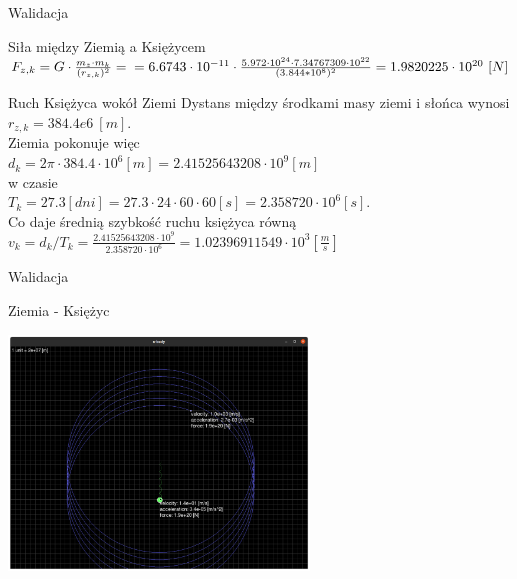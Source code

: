 \documentclass{beamer}
\begin{document}
\begin{frame}{Walidacja}
    \begin{block}{Siła między Ziemią a Księżycem}
        $F_{z,k} = G\cdot \frac{m_{z}\cdot m_{k}}{(r_{z,k})^2} = \\
        = 6.6743\cdot 10^{-11}\cdot 
        \frac{5.972\cdot 10^{24}\cdot 7.34767309\cdot 10^{22}}
        {(3.844 * 10^{8})^2} = 1.9820225\cdot 10^{20}\ [N]$
    \end{block}
    
    \begin{block}{Ruch Księżyca wokół Ziemi}
        Dystans między środkami masy ziemi i słońca wynosi\\ 
        $r_{z,k} = 384.4e6\ [m]$.\\
        Ziemia pokonuje więc\\ 
        $d_k = 2 \pi \cdot 384.4\cdot 10^{6} [m] = 2.41525643208\cdot 10^{9} [m]$\\
        w czasie\\ 
        $T_k = 27.3 [dni] = 27.3\cdot 24\cdot 60\cdot 60 [s] = 2.358720\cdot 10^{6} [s]$.\\
        Co daje średnią szybkość ruchu księżyca równą\\
        $v_k = d_k / T_k 
        = \frac{2.41525643208\cdot 10^{9}}{2.358720\cdot 10^{6}} 
        = 1.02396911549\cdot 10^{3} [\frac{m}{s}]$
    \end{block}
\end{frame}

\begin{frame}{Walidacja}
    \begin{block}{Ziemia - Księżyc}
        \begin{center}
            \includegraphics[width=8cm]{./img/earth-moon.png}
        \end{center}
    \end{block}
\end{frame}
\end{document}
